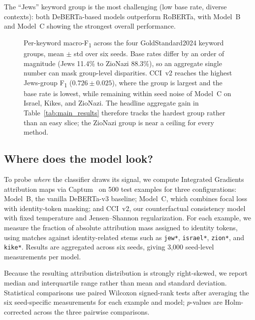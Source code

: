 The ``Jews'' keyword group is the most challenging (low base rate, diverse contexts): both DeBERTa-based models outperform RoBERTa, with Model~B and Model~C showing the strongest overall performance.

\begin{figure}[h]
\centering
\caption{Per-keyword macro-F\textsubscript{1} across the four GoldStandard2024 keyword groups, mean $\pm$ std over six seeds. Base rates differ by an order of magnitude (Jews 11.4\% to ZioNazi 88.3\%), so an aggregate single number can mask group-level disparities. CCI~v2 reaches the highest Jews-group F\textsubscript{1} ($0.726 \pm 0.025$), where the group is largest and the base rate is lowest, while remaining within seed noise of Model~C on Israel, Kikes, and ZioNazi. The headline aggregate gain in Table~\ref{tab:main_results} therefore tracks the hardest group rather than an easy slice; the ZioNazi group is near a ceiling for every method.}
\label{fig:per_keyword_heatmap}
\end{figure}

\subsection{Where does the model look?}
\label{sec:attribution}

To probe \emph{where} the classifier draws its signal, we compute Integrated Gradients~\citep{sundararajan2017axiomatic} attribution maps via Captum~\citep{kokhlikyan2020captum} on 500 test examples for three configurations: Model~B, the vanilla DeBERTa-v3 baseline; Model~C, which combines focal loss with identity-token masking; and CCI~v2, our counterfactual consistency model with fixed temperature and Jensen--Shannon regularization. For each example, we measure the fraction of absolute attribution mass assigned to identity tokens, using matches against identity-related stems such as \texttt{jew*}, \texttt{israel*}, \texttt{zion*}, and \texttt{kike*}. Results are aggregated across six seeds, giving 3{,}000 seed-level measurements per model.

Because the resulting attribution distribution is strongly right-skewed, we report median and interquartile range rather than mean and standard deviation. Statistical comparisons use paired Wilcoxon signed-rank tests after averaging the six seed-specific measurements for each example and model; $p$-values are Holm-corrected across the three pairwise comparisons.

